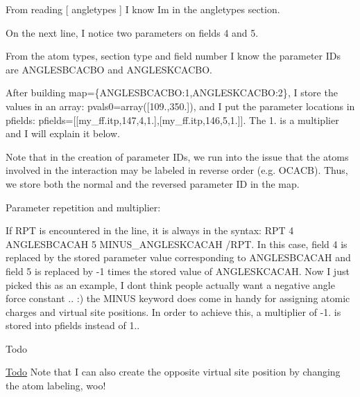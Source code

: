 From reading {\ttfamily \mbox{[} angletypes \mbox{]}} I know I\textquotesingle{}m in the \textquotesingle{}angletypes\textquotesingle{} section.

On the next line, I notice two parameters on fields 4 and 5.

From the atom types, section type and field number I know the parameter I\+Ds are {\ttfamily \textquotesingle{}A\+N\+G\+L\+E\+S\+B\+C\+A\+C\+BO\textquotesingle{}} and {\ttfamily \textquotesingle{}A\+N\+G\+L\+E\+S\+K\+C\+A\+C\+BO\textquotesingle{}}.

After building {\ttfamily map=\{\textquotesingle{}A\+N\+G\+L\+E\+S\+B\+C\+A\+C\+BO\textquotesingle{}\+:1,\textquotesingle{}A\+N\+G\+L\+E\+S\+K\+C\+A\+C\+BO\textquotesingle{}\+:2\}}, I store the values in an array\+: {\ttfamily pvals0=array(\mbox{[}109.,350.\mbox{]})}, and I put the parameter locations in pfields\+: {\ttfamily pfields=\mbox{[}\mbox{[}\textquotesingle{}my\+\_\+ff.\+itp\textquotesingle{},147,4,1.\mbox{]},\mbox{[}\textquotesingle{}my\+\_\+ff.\+itp\textquotesingle{},146,5,1.\mbox{]}\mbox{]}}. The 1. is a \textquotesingle{}multiplier\textquotesingle{} and I will explain it below.

Note that in the creation of parameter I\+Ds, we run into the issue that the atoms involved in the interaction may be labeled in reverse order (e.\+g. {\ttfamily O\+C\+A\+CB}). Thus, we store both the normal and the reversed parameter ID in the map.

Parameter repetition and multiplier\+:

If {\ttfamily \textquotesingle{}R\+PT\textquotesingle{}} is encountered in the line, it is always in the syntax\+: {\ttfamily \textquotesingle{}R\+PT 4 A\+N\+G\+L\+E\+S\+B\+C\+A\+C\+AH 5 M\+I\+N\+U\+S\+\_\+\+A\+N\+G\+L\+E\+S\+K\+C\+A\+C\+AH /\+R\+PT\textquotesingle{}}. In this case, field 4 is replaced by the stored parameter value corresponding to {\ttfamily A\+N\+G\+L\+E\+S\+B\+C\+A\+C\+AH} and field 5 is replaced by -\/1 times the stored value of {\ttfamily A\+N\+G\+L\+E\+S\+K\+C\+A\+C\+AH}. Now I just picked this as an example, I don\textquotesingle{}t think people actually want a negative angle force constant .. \+:) the {\ttfamily M\+I\+N\+US} keyword does come in handy for assigning atomic charges and virtual site positions. In order to achieve this, a multiplier of -\/1. is stored into pfields instead of 1..

\begin{DoxyRefDesc}{Todo}
\item[\hyperlink{todo__todo000010}{Todo}]Note that I can also create the opposite virtual site position by changing the atom labeling, woo!\end{DoxyRefDesc}


